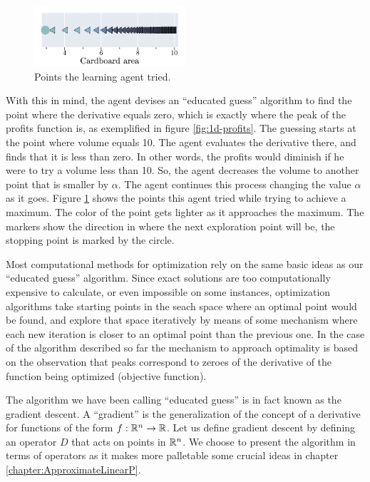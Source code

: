 \begin{figure}
   \centering
   \includegraphics[width=0.5\textwidth]{img/gd-points.pdf} 
   \caption{Points the learning agent tried.}
   \label{fig:gd-points}
\end{figure}

With this in mind, the agent devises an ``educated guess'' algorithm to find the
point where the derivative equals zero, which is exactly where the peak of the
profits function is, as exemplified in figure \ref{fig:1d-profits}. The guessing
starts at the point where volume equals 10. The agent evaluates the derivative
there, and finds that it is less than zero. In other words, the profits would
diminish if he were to try a volume less than 10. So, the agent decreases the
volume to another point that is smaller by $\alpha$. The agent continues this
process changing the value $\alpha$ as it goes. Figure \ref{fig:gd-points} shows
the points this agent tried while trying to achieve a maximum. The color of the
point gets lighter as it approaches the maximum. The markers show the direction
in where the next exploration point will be, the stopping point is marked by the
circle.

Most computational methods for optimization rely on the same basic ideas as our
``educated guess'' algorithm. Since exact solutions are too computationally
expensive to calculate, or even impossible on some instances, optimization
algorithms take starting points in the seach space where an optimal point would
be found, and explore that space iteratively by means of some mechanism where
each new iteration is closer to an optimal point than the previous one. In the
case of the algorithm described so far the mechanism to approach optimality is
based on the observation that peaks correspond to zeroes of the derivative of
the function being optimized (objective function).

The algorithm we have been calling ``educated guess'' is in fact known as the
gradient descent. A ``gradient'' is the generalization of the concept of a
derivative for functions of the form $f: \mathbb{R}^{n} \to \mathbb{R}$. Let us define gradient
descent by defining an operator $D$ that acts on points in $\mathbb{R}^{n}$. We choose
to present the algorithm in terms of operators as it makes more palletable some
crucial ideas in chapter \ref{chapter:ApproximateLinearP}.


